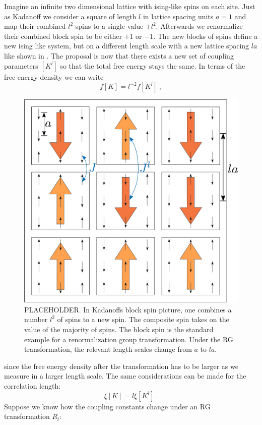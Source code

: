 	Imagine an infinite two dimensional lattice with ising-like spins on each site.  Just as Kadanoff \cite{kadanoff1966scaling} we consider a square of length $l$ in lattice spacing units $a=1$ and map  their combined $l^2$ spins to a single value $\pm l^2$. Afterwards we renormalize their combined block spin to be either $+1$ or $-1$. The new blocks of spins define a new ising like system, but on a different length scale with a new lattice spacing $la$ like shown in . The proposal is now that there exists a new set of coupling parameters $[K^l]$ so that the total free energy stays the same. In terms of the free energy density we can write 
	\begin{equation} \label{free-energy-density}
		f[K] =	l^{-2} f[K^l]~,
	\end{equation}
	\begin{figure}[htp]
		\centering
		\includegraphics[width=0.7\linewidth]{graphics/RG-Iteration.png}
		\caption{PLACEHOLDER. In Kadanoffs block spin picture, one combines a number $l^2$ of spins to a new spin. The composite spin takes on the value of the majority of spins. The block spin is the standard example for a renormalization group transformation. Under the RG transformation, the relevant length scales change from $a$ to $la$.}
		\label{Fig::RG-Iteration}
	\end{figure}
	since the free energy density after the transformation has to be larger as we measure in a larger length scale. The same considerations can be made for the correlation length:
	\begin{equation}
		\xi[K] = l \xi[K^l]~.
	\end{equation}
	Suppose we know how the coupling constants change under an RG transformation $R_l$:
